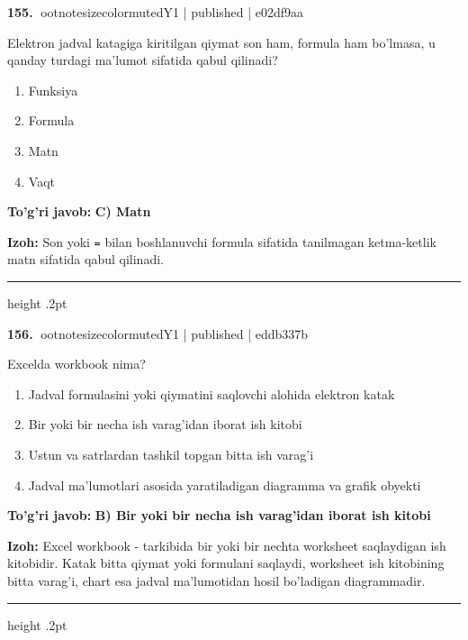 \documentclass[10pt,a4paper]{article}
\begin{document}
\textbf{\color{ink}155.} {ootnotesizecolor{muted}Y1 | published | e02df9aa}
\par
Elektron jadval katagiga kiritilgan qiymat son ham, formula ham bo'lmasa, u qanday turdagi ma'lumot sifatida qabul qilinadi?
\begin{enumerate}[label=\Alph*),leftmargin=9mm]
\item Funksiya
\item Formula
\item Matn
\item Vaqt
\end{enumerate}
\begin{tcolorbox}[enhanced,breakable,colback=teal!4,colframe=teal!55!black,boxrule=0.45pt,arc=1.2mm,left=2.8mm,right=2.8mm,top=2mm,bottom=2mm]
\textbf{\color{teal}To'g'ri javob:} \textbf{C) Matn}
\par\smallskip
\textbf{Izoh:} Son yoki \texttt{=} bilan boshlanuvchi formula sifatida tanilmagan ketma-ketlik matn sifatida qabul qilinadi.
\end{tcolorbox}
\vspace{2mm}\hrule height .2pt\vspace{2mm}

\textbf{\color{ink}156.} {ootnotesizecolor{muted}Y1 | published | eddb337b}
\par
Excelda workbook nima?
\begin{enumerate}[label=\Alph*),leftmargin=9mm]
\item Jadval formulasini yoki qiymatini saqlovchi alohida elektron katak
\item Bir yoki bir necha ish varag'idan iborat ish kitobi
\item Ustun va satrlardan tashkil topgan bitta ish varag'i
\item Jadval ma'lumotlari asosida yaratiladigan diagramma va grafik obyekti
\end{enumerate}
\begin{tcolorbox}[enhanced,breakable,colback=teal!4,colframe=teal!55!black,boxrule=0.45pt,arc=1.2mm,left=2.8mm,right=2.8mm,top=2mm,bottom=2mm]
\textbf{\color{teal}To'g'ri javob:} \textbf{B) Bir yoki bir necha ish varag'idan iborat ish kitobi}
\par\smallskip
\textbf{Izoh:} Excel workbook - tarkibida bir yoki bir nechta worksheet saqlaydigan ish kitobidir. Katak bitta qiymat yoki formulani saqlaydi, worksheet ish kitobining bitta varag'i, chart esa jadval ma'lumotidan hosil bo'ladigan diagrammadir.
\end{tcolorbox}
\vspace{2mm}\hrule height .2pt\vspace{2mm}
\end{document}
